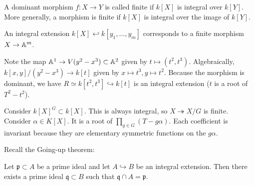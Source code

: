 \documentclass[twoside, 10pt]{article}
\begin{document}
    \begin{defn} A dominant morphism $f: X \rightarrow Y$ is
    called finite if $k[X]$ is integral over $k[Y]$. More generally, a morphism
is finite if $k[X]$ is integral over the image of $k[Y]$.  \end{defn}

    \begin{exm} An integral extension $k[X]
    \hookleftarrow k[y_1, \ldots, y_m]$ corresponds to a finite morphism $X
\rightarrow \mathbb{A}^m$.  \end{exm}

    \begin{exm} Note the map $\mathbb{A}^1 \rightarrow
        V(y^2-x^3) \subset \mathbb{A}^2$ given by $t \mapsto (t^2,t^3)$. Algebraically,
        $k[x,y]/(y^2-x^3) \rightarrow k[t]$ given by $x \mapsto t^3, y \mapsto
        t^2$. Because the morphism is dominant, we have $R \simeq k[t^2, t^3]
    \hookrightarrow k[t]$ is an integral extension ($t$ is a root of
$T^2-t^2$).  \end{exm}

    \begin{exm} Consider $k[X]^G \subset k[X]$. This is always integral, so $X
        \twoheadrightarrow X/G$ is finite. Consider $\alpha \in K[X]$. It is a
        root of $\prod_{g \in G}(T-g\alpha)$. Each coefficient is invariant
        because they are elementary symmetric functions on the $g\alpha$.
    \end{exm}

    Recall the Going-up theorem:

    \begin{thm}[Going-up] Let $\mathfrak{p} \subset A$ be a prime ideal and let
    $A \hookrightarrow B$ be an integral extension. Then there exists a prime
ideal $\mathfrak{q} \subset B$ such that $\mathfrak{q} \cap A = \mathfrak{p}$.
\end{thm}
\end{document}
